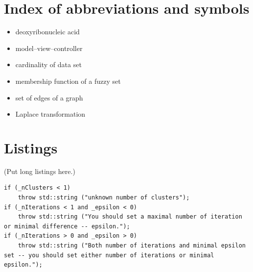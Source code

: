 \documentclass[a4paper,twoside,12pt]{book}
\begin{document}
\begin{appendices}


\chapter{Index of abbreviations and symbols}

\begin{itemize}
\item[DNA] deoxyribonucleic acid
\item[MVC] model--view--controller 
\item[$N$] cardinality of data set
\item[$\mu$] membership function of a fuzzy set
\item[$\mathbb{E}$] set of edges of a graph
\item[$\mathcal{L}$] Laplace transformation
\end{itemize}
 
\chapter{Listings}

(Put long listings here.)

\begin{lstlisting}
if (_nClusters < 1)
	throw std::string ("unknown number of clusters");
if (_nIterations < 1 and _epsilon < 0)
	throw std::string ("You should set a maximal number of iteration or minimal difference -- epsilon.");
if (_nIterations > 0 and _epsilon > 0)
	throw std::string ("Both number of iterations and minimal epsilon set -- you should set either number of iterations or minimal epsilon.");
\end{lstlisting}



 

\end{appendices}
\end{document}
